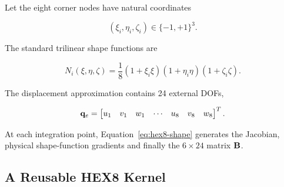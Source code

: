 Let the eight corner nodes have natural coordinates

\begin{equation}
    (\xi_i,\eta_i,\zeta_i)\in\{-1,+1\}^3.
\end{equation}

The standard trilinear shape functions are

\begin{equation}\label{eq:hex8-shape}
    \boxed{
    N_i(\xi,\eta,\zeta)
    =\frac{1}{8}
    (1+\xi_i\xi)
    (1+\eta_i\eta)
    (1+\zeta_i\zeta)
    }.
\end{equation}

The displacement approximation contains 24 external DOFs,

\begin{equation}
    \mathbf{q}_e
    =
    \begin{bmatrix}
        u_1&v_1&w_1&\cdots&u_8&v_8&w_8
    \end{bmatrix}^T.
\end{equation}

At each integration point, Equation~\eqref{eq:hex8-shape} generates the Jacobian,
physical shape-function gradients and finally the $6\times24$ matrix $\mathbf{B}$.

\subsection{A Reusable HEX8 Kernel}

